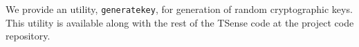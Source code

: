 

We provide an utility, \texttt{generatekey}, for generation of random cryptographic keys. This utility is available along with the rest of the TSense code at the project code repository.

